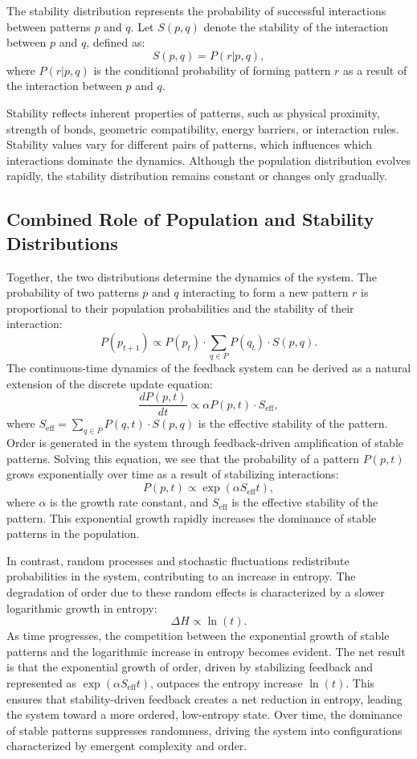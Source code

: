\documentclass[entropy,article,submit,pdftex,moreauthors]{Definitions/mdpi}
\begin{document}
The stability distribution represents the probability of successful interactions between patterns \( p \) and \( q \). Let \( S(p, q) \) denote the stability of the interaction between \( p \) and \( q \), defined as:
\[
S(p, q) = P(r | p, q),
\]
where \( P(r | p, q) \) is the conditional probability of forming pattern \( r \) as a result of the interaction between \( p \) and \( q \).

Stability reflects inherent properties of patterns, such as physical proximity, strength of bonds, geometric compatibility, energy barriers, or interaction rules. Stability values vary for different pairs of patterns, which influences which interactions dominate the dynamics. Although the population distribution evolves rapidly, the stability distribution remains constant or changes only gradually.

\subsection{Combined Role of Population and Stability Distributions}

Together, the two distributions determine the dynamics of the system. The probability of two patterns \( p \) and \( q \) interacting to form a new pattern \( r \) is proportional to their population probabilities and the stability of their interaction:
\[
P(p_{t+1}) \propto P(p_t) \cdot \sum_{q \in P} P(q_t) \cdot S(p, q).
\]
The continuous-time dynamics of the feedback system can be derived as a natural extension of the discrete update equation:
\[
\frac{dP(p, t)}{dt} \propto \alpha P(p, t) \cdot S_{\text{eff}},
\]
where \( S_{\text{eff}} = \sum_{q \in P} P(q, t) \cdot S(p, q) \) is the effective stability of the pattern. Order is generated in the system through feedback-driven amplification of stable patterns. Solving this equation, we see that the probability of a pattern \( P(p, t) \) grows exponentially over time as a result of stabilizing interactions:
\[
P(p, t) \propto \exp(\alpha S_{\text{eff}} t),
\]
where \( \alpha \) is the growth rate constant, and \( S_{\text{eff}} \) is the effective stability of the pattern. This exponential growth rapidly increases the dominance of stable patterns in the population.

In contrast, random processes and stochastic fluctuations redistribute probabilities in the system, contributing to an increase in entropy. The degradation of order due to these random effects is characterized by a slower logarithmic growth in entropy:
\[
\Delta H \propto \ln(t).
\]
As time progresses, the competition between the exponential growth of stable patterns and the logarithmic increase in entropy becomes evident. The net result is that the exponential growth of order, driven by stabilizing feedback and represented as \( \exp(\alpha S_{\text{eff}} t) \), outpaces the entropy increase \( \ln(t) \). This ensures that stability-driven feedback creates a net reduction in entropy, leading the system toward a more ordered, low-entropy state. Over time, the dominance of stable patterns suppresses randomness, driving the system into configurations characterized by emergent complexity and order.
\end{document}
